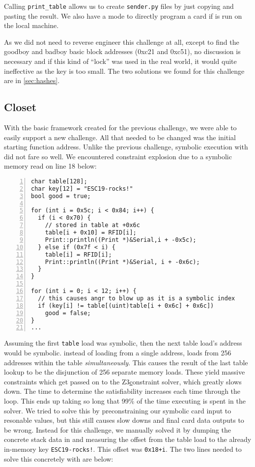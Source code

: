 Calling \texttt{print\_table} allows us to create \texttt{sender.py} files by just copying and pasting the result. We also have a mode to directly program a card if \angr is run on the local machine.

As we did not need to reverse engineer this challenge at all, except to find the goodboy and badboy basic block addresses (0xc21 and 0xc51), no discussion is necessary and if this kind of ``lock'' was used in the real world, it would quite ineffective as the key is too small.
The two solutions we found for this challenge are in \autoref{sec:hashes}.

\subsection{Closet}
With the basic \angr framework created for the previous challenge, we were able to easily support a new challenge. All that needed to be changed was the initial starting function address. Unlike the previous challenge, symbolic execution with \angr did not fare so well.
We encountered constraint explosion due to a symbolic memory read on line 18 below:

\begin{lstlisting}[numbers=left,xleftmargin=2em]
char table[128];
char key[12] = "ESC19-rocks!"
bool good = true;

for (int i = 0x5c; i < 0x84; i++) {
  if (i < 0x70) {
    // stored in table at +0x6c
    table[i + 0x10] = RFID[i];
    Print::println((Print *)&Serial,i + -0x5c);
  } else if (0x7f < i) {
    table[i] = RFID[i];
    Print::println((Print *)&Serial, i + -0x6c);
  }
}

for (int i = 0; i < 12; i++) {
  // this causes angr to blow up as it is a symbolic index
  if (key[i] != table[(uint)table[i + 0x6c] + 0x6c])
    good = false;
}
...
\end{lstlisting}

Assuming the first \texttt{table} load was symbolic, then the next table load's address would be symbolic. \angr instead of loading from a single address, loads from 256 addresses within the table \emph{simultaneously}. This causes the result of the last table lookup to be the disjunction of 256 separate memory loads. These yield massive constraints which get passed on to the Z3\href{https://github.com/angr/angr-z3} constraint solver, which greatly slows down. The time to determine the satisfiability increases each time through the loop. This ends up taking so long that 99\% of the time executing is spent in the solver. We tried to solve this by preconstraining our symbolic card input to resonable values, but this still causes slow downs and final card data outputs to be wrong. Instead for this challenge, we manually solved it by dumping the concrete stack data in \angr and measuring the offset from the table load to the already in-memory key \texttt{ESC19-rocks!}. This offset was \texttt{0x18+i}. The two lines needed to solve this concretely with \angr are below:

